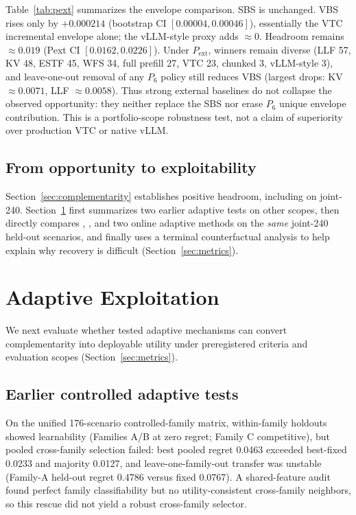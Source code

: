 \documentclass[runningheads]{llncs}
\begin{document}
Table~\ref{tab:pext} summarizes the envelope comparison. SBS is unchanged.
VBS rises only by $+0.000214$ (bootstrap CI $[0.00004,0.00046]$), essentially
the VTC incremental envelope alone; the vLLM-style proxy adds $\approx 0$.
Headroom remains $\approx 0.019$ (Pext CI $[0.0162,0.0226]$). Under
$P_{\mathrm{ext}}$, winners remain diverse (LLF 57, KV 48, ESTF 45, WFS 34,
full prefill 27, VTC 23, chunked 3, vLLM-style 3), and leave-one-out removal of
any $P_6$ policy still reduces VBS (largest drops: KV $\approx 0.0071$,
LLF $\approx 0.0058$). Thus strong external baselines do not collapse the
observed opportunity: they neither replace the SBS nor erase $P_6$ unique
envelope contribution. This is a portfolio-scope robustness test, not a claim
of superiority over production VTC or native vLLM.

\subsection{From opportunity to exploitability}

Section~\ref{sec:complementarity} establishes positive \vbs{} headroom,
including on joint-240. Section~\ref{sec:gap} first summarizes two earlier
adaptive tests on other scopes, then directly compares \sbs{}, \vbs{}, and two
online adaptive methods on the \emph{same} joint-240 held-out scenarios, and
finally uses a terminal counterfactual analysis to help explain why recovery
is difficult (Section~\ref{sec:metrics}).

\section{Adaptive Exploitation}
\label{sec:gap}

We next evaluate whether tested adaptive mechanisms can convert complementarity
into deployable utility under preregistered criteria and evaluation scopes
(Section~\ref{sec:metrics}).

\subsection{Earlier controlled adaptive tests}
\label{sec:earlier-adaptive}

On the unified 176-scenario controlled-family matrix, within-family holdouts
showed learnability (Families A/B at zero regret; Family C competitive), but
pooled cross-family selection failed: best pooled regret 0.0463 exceeded
best-fixed 0.0233 and majority 0.0127, and leave-one-family-out transfer was
unstable (Family-A held-out regret 0.4786 versus fixed 0.0767). A shared-feature audit found perfect family classifiability but no
utility-consistent cross-family neighbors, so this rescue did not yield a
robust cross-family selector.
\end{document}
